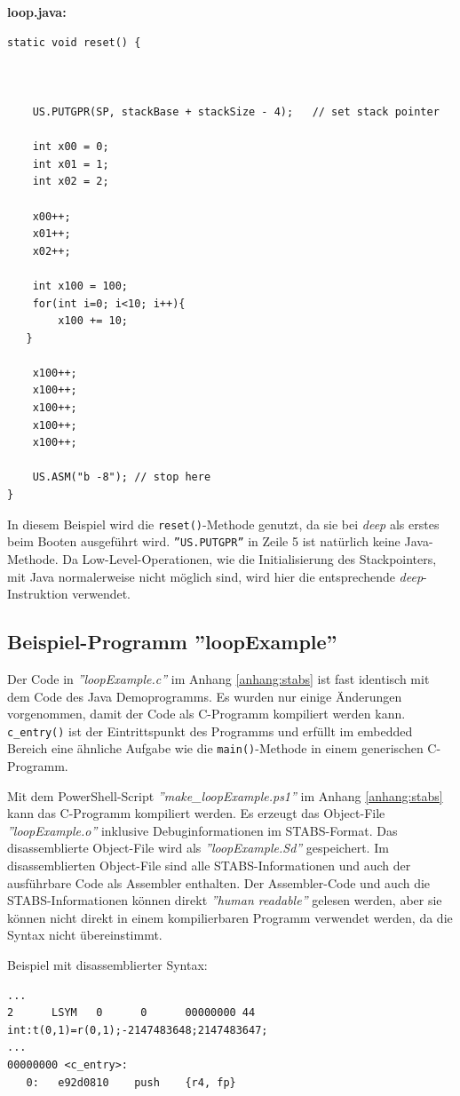 \textbf{loop.java:}
\lstset{language=java}
\begin{lstlisting}
static void reset() {



	US.PUTGPR(SP, stackBase + stackSize - 4);	// set stack pointer
	
	int x00 = 0;
	int x01 = 1;
	int x02 = 2;
	
	x00++;
	x01++;
	x02++;
	
	int x100 = 100;
	for(int i=0; i<10; i++){
		x100 += 10;
   }
		
	x100++;
	x100++;
	x100++;
	x100++;
	x100++;

	US.ASM("b -8"); // stop here
}
\end{lstlisting}

In diesem Beispiel wird die \texttt{reset()}-Methode genutzt, da sie bei \textit{deep} als erstes beim Booten ausgeführt wird.
\texttt{''US.PUTGPR''} in Zeile 5 ist natürlich keine Java-Methode.
Da Low-Level-Operationen, wie die Initialisierung des Stackpointers, mit Java normalerweise nicht möglich sind, wird hier die entsprechende \textit{deep}-Instruktion verwendet.


\subsection{Beispiel-Programm ''loopExample''}
Der Code in \textit{''loopExample.c''} im Anhang \ref{anhang:stabs} ist fast identisch mit dem Code des Java Demoprogramms.
Es wurden nur einige Änderungen vorgenommen, damit der Code als C-Programm kompiliert werden kann.
\texttt{c\_entry()} ist der Eintrittspunkt des Programms und erfüllt im embedded Bereich eine ähnliche Aufgabe wie die  \texttt{main()}-Methode in einem generischen C-Programm.

Mit dem PowerShell-Script \textit{''make\_loopExample.ps1''} im Anhang \ref{anhang:stabs} kann das C-Programm kompiliert werden.
Es erzeugt das Object-File \textit{''loopExample.o''} inklusive Debuginformationen im STABS-Format.
Das disassemblierte Object-File wird als \textit{''loopExample.Sd''} gespeichert.
Im disassemblierten Object-File sind alle STABS-Informationen und auch der ausführbare Code als Assembler enthalten.
Der Assembler-Code und auch die STABS-Informationen können direkt \textit{''human readable''} gelesen werden, aber sie können nicht direkt in einem kompilierbaren Programm verwendet werden, da die Syntax nicht übereinstimmt.

Beispiel mit disassemblierter Syntax:
\lstset{language=plain}
\begin{lstlisting}
...
2      LSYM   0      0      00000000 44     int:t(0,1)=r(0,1);-2147483648;2147483647;
...
00000000 <c_entry>:
   0:	e92d0810 	push	{r4, fp}
\end{lstlisting}


